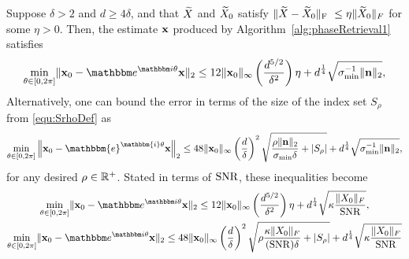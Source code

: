 \begin{theorem}\label{thm:MainRes}
Suppose $\delta > 2$ and $d \ge 4 \delta$, and that $\widetilde{X}$ and $\widetilde{X}_0$ satisfy $\Vert \widetilde{X} - \widetilde{X}_0 \Vert_{\rm F}~\leq \eta \Vert \widetilde{X}_0 \Vert_F$ for some $\eta>0$.  Then, the estimate $\mathbf x$ produced by Algorithm~\ref{alg:phaseRetrieval1} satisfies 
\[ \mintheta \norm{\x_0 - \eit \x}_2 \leq 12 \norm{\x_0}_{\infty} \left( \frac{d^{5/2}}{\delta^2} \right) \eta  + d^{\frac{1}{4}} \sqrt{\sigma_{\min}^{-1} \| \n \|_2 },\]
Alternatively, one can bound the error in terms of the size of the index set $S_\rho$ from \eqref{equ:SrhoDef} as
        \begin{equation}
\min_{\theta \in [0, 2 \pi]} \left\Vert  \x_0 - \mathbbm{e}^{\mathbbm{i} \theta} \x \right\Vert_2 \leq 48 \Vert \x_0 
        \Vert_{\infty} \left( \frac{d}{\delta} \right)^2 \sqrt{ \frac{\rho \norm{\n}_2}{\sigma_{\min}\delta} + \left| S_\rho \right|} + d^{\frac{1}{4}} \sqrt{\sigma_{\min}^{-1} \| \n \|_2 }, \label{equ:ManRes2} 
\end{equation}
for any desired $\rho \in \mathbb{R}^+$.  Stated in terms of $\operatorname{SNR}$, these inequalities become
\begin{equation}
  \begin{gathered}
    \mintheta \norm{\x_0 - \eit \x}_2 \leq 12 \norm{\x_0}_{\infty} \left(\frac{d^{5/2}}{\delta^2}\right) \eta  + d^{\frac{1}{4}} \sqrt{\kappa \frac{\norm{X_0}_F}{\SNR} }, \\
    \mintheta \norm{\x_0 - \eit \x}_2 \leq 48 \norm{\x_0}_{\infty} \left( \frac{d}{\delta} \right)^2 \sqrt{\rho \frac{\kappa \norm{X_0}_F}{(\SNR) \delta} + \left| S_\rho \right|} + d^{\frac{1}{4}} \sqrt{\kappa \frac{\norm{X_0}_F}{\SNR}}
  \end{gathered}
  \label{eq:mainres2_SNR}
\end{equation}
\end{theorem}

